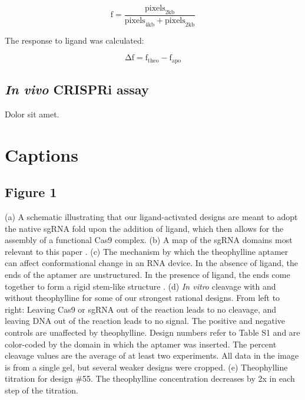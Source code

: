 \documentclass{article}
\begin{document}
\begin{displaymath}
 \mathrm{f} = \frac{\mathrm{pixels}_\mathrm{2kb}}{\mathrm{pixels}_\mathrm{4kb} 
 + \mathrm{pixels}_\mathrm{2kb}}
\end{displaymath}

The response to ligand was calculated: 

\begin{displaymath}
 \mathrm{Δf} = \mathrm{f}_\mathrm{theo} - \mathrm{f}_\mathrm{apo}
\end{displaymath}

\subsection{\emph{In vivo} CRISPRi assay}

Dolor sit amet.

\section{Captions}

\subsection{Figure 1}

(a) A schematic illustrating that our ligand-activated designs are meant to 
adopt the native sgRNA fold upon the addition of ligand, which then allows 
for the assembly of a functional Cas9 complex.
(b) A map of the sgRNA domains most relevant to this paper 
\autocite{briner2014}.
(c) The mechanism by which the theophylline aptamer can affect conformational 
change in an RNA device.  In the absence of ligand, the ends of the aptamer 
are unstructured.  In the presence of ligand, the ends come together to form 
a rigid stem-like structure \autocite{zimmerman1997}. 
(d) \emph{In vitro} cleavage with and without theophylline for some of our 
strongest rational designs.  From left to right: Leaving Cas9 or sgRNA out of 
the reaction leads to no cleavage, and leaving DNA out of the reaction leads 
to no signal.  The positive and negative controls are unaffected by 
theophylline.  Design numbers refer to Table S1 and are color-coded by the 
domain in which the aptamer was inserted.  The percent cleavage values are 
the average of at least two experiments.  All data in the image is from a 
single gel, but several weaker designs were cropped.
(e) Theophylline titration for design \#55.  The theophylline concentration 
decreases by 2x in each step of the titration.
\end{document}

